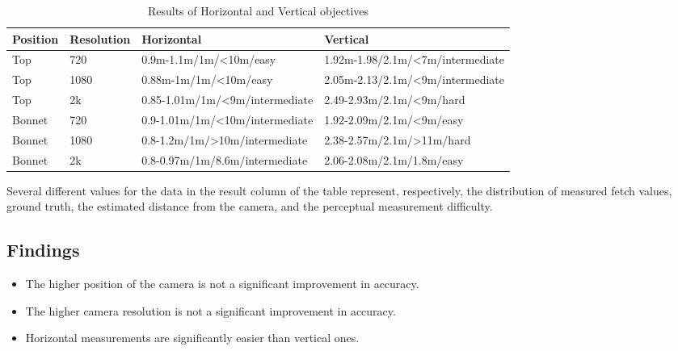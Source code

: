 \begin{table}[!h]
  \begin{center}
   \begin{tabular}{| p{2cm} | p{2cm} | p{5cm} | p{5cm} |}
      \hline
        Position & Resolution & Horizontal & Vertical  \\ \hline	    
        Top & 720 & 0.9m-1.1m/1m/<10m/easy & 1.92m-1.98/2.1m/<7m/intermediate \\ \hline
        Top & 1080 & 0.88m-1m/1m/<10m/easy & 2.05m-2.13/2.1m/<9m/intermediate \\ \hline
        Top & 2k & 0.85-1.01m/1m/<9m/intermediate & 2.49-2.93m/2.1m/<9m/hard \\ \hline
        Bonnet & 720 & 0.9-1.01m/1m/<10m/intermediate & 1.92-2.09m/2.1m/<9m/easy \\ \hline
        Bonnet & 1080 & 0.8-1.2m/1m/>10m/intermediate & 2.38-2.57m/2.1m/>11m/hard \\ \hline
        Bonnet & 2k & 0.8-0.97m/1m/8.6m/intermediate & 2.06-2.08m/2.1m/1.8m/easy \\ \hline
      \end{tabular}
      \caption{Results of Horizontal and Vertical objectives}
    \label{fig:Results1}
  \end{center}
  \end{table}

Several different values for the data in the result column of the table represent, respectively, the distribution of measured fetch values, ground truth, the estimated distance from the camera, and the perceptual measurement difficulty.

\subsection{Findings}

\renewcommand{\labelitemi}{$\square$}
\begin{itemize}     
    \item The higher position of the camera is not a significant improvement in accuracy.

    \item The higher camera resolution is not a significant improvement in accuracy.
    
    \item Horizontal measurements are significantly easier than vertical ones.
    
\end{itemize}

